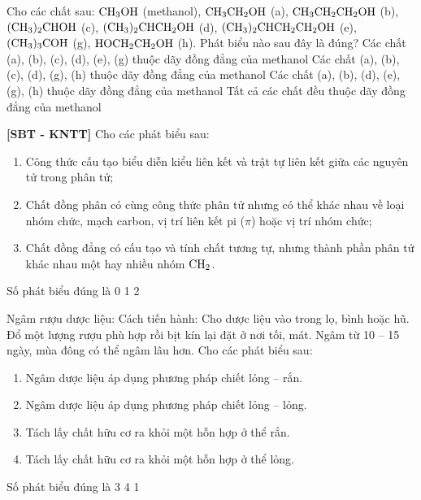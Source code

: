 \documentclass[12pt,a4paper]{article}
\begin{document}
\begin{ex}
Cho các chất sau: $\ce{CH3OH}$ (methanol), $\ce{CH3CH2OH}$ (a), $\ce{CH3CH2CH2OH}$ (b), $\ce{(CH3)2CHOH}$ (c), $\ce{(CH3)2CHCH2OH}$ (d), $\ce{(CH3)2CHCH2CH2OH}$ (e), $\ce{(CH3)3COH}$ (g), $\ce{HOCH2CH2OH}$ (h). Phát biểu nào sau đây là đúng?
\choice
{\True Các chất (a), (b), (c), (d), (e), (g) thuộc dãy đồng đẳng của methanol}
{Các chất (a), (b), (c), (d), (g), (h) thuộc dãy đồng đẳng của methanol}
{Các chất (a), (b), (d), (e), (g), (h) thuộc dãy đồng đẳng của methanol}
{Tất cả các chất đều thuộc dãy đồng đẳng của methanol}

\end{ex}

\begin{ex}
\textbf{[SBT - KNTT]} Cho các phát biểu sau:
\begin{enumerate}[(1)]
	\item Công thức cấu tạo biểu diễn kiểu liên kết và trật tự liên kết giữa các nguyên tử trong phân tử;
	\item Chất đồng phân có cùng công thức phân tử nhưng có thể khác nhau về loại nhóm chức, mạch carbon, vị trí liên kết pi ($\pi$) hoặc vị trí nhóm chức;
	\item Chất đồng đẳng có cấu tạo và tính chất tương tự, nhưng thành phần phân tử khác nhau một hay nhiều nhóm $\ce{CH2}$.
\end{enumerate}
Số phát biểu đúng là
\choice
{0}
{1}
{2}
{}

\end{ex}

\begin{ex}
Ngâm rượu dược liệu: Cách tiến hành: Cho dược liệu vào trong lọ, bình hoặc hũ. Đổ một lượng rượu phù hợp rồi bịt kín lại đặt ở nơi tối, mát. Ngâm từ 10 -- 15 ngày, mùa đông có thể ngâm lâu hơn. Cho các phát biểu sau:
\begin{enumerate}[(1)]
	\item Ngâm dược liệu áp dụng phương pháp chiết lỏng -- rắn.
	\item Ngâm dược liệu áp dụng phương pháp chiết lỏng -- lỏng.
	\item Tách lấy chất hữu cơ ra khỏi một hỗn hợp ở thể rắn.
	\item Tách lấy chất hữu cơ ra khỏi một hỗn hợp ở thể lỏng.
\end{enumerate}
Số phát biểu đúng là
\choice
{}
{3}
{4}
{1}

\end{ex}
\end{document}
